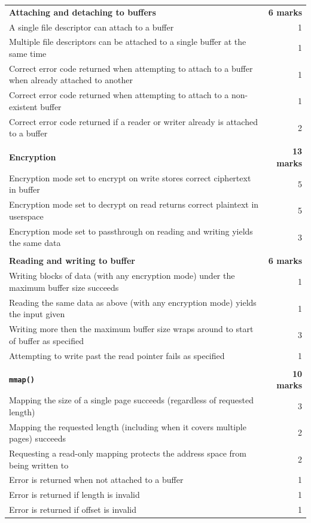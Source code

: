 \documentclass[12pt,a4paper]{article}
\begin{document}
\begin{longtable}{p{13cm} r}
    & \\
    \midrule
    \textbf{Attaching and detaching to buffers} & \textbf{6 marks} \\
    A single file descriptor can attach to a buffer & 1 \\
    Multiple file descriptors can be attached to a single buffer at the same time & 1 \\
    Correct error code returned when attempting to attach to a buffer when already attached to another & 1 \\
    Correct error code returned when attempting to attach to a non-existent buffer & 1 \\
    Correct error code returned if a reader or writer already is attached to a buffer & 2 \\

    & \\
    \midrule
    \textbf{Encryption} & \textbf{13 marks} \\
    Encryption mode set to encrypt on write stores correct ciphertext in buffer & 5 \\
    Encryption mode set to decrypt on read returns correct plaintext in userspace & 5 \\
    Encryption mode set to passthrough on reading and writing yields the same data & 3 \\

    & \\
    \midrule
    \textbf{Reading and writing to buffer} & \textbf{6 marks} \\
    Writing blocks of data (with any encryption mode) under the maximum buffer size succeeds & 1 \\
    Reading the same data as above (with any encryption mode) yields the input given & 1 \\
    Writing more then the maximum buffer size wraps around to start of buffer as specified & 3 \\
    Attempting to write past the read pointer fails as specified & 1 \\

    & \\
    \midrule
    \textbf{\texttt{mmap()}} & \textbf{10 marks} \\
    Mapping the size of a single page succeeds (regardless of requested length) & 3 \\
    Mapping the requested length (including when it covers multiple pages) succeeds & 2 \\
    Requesting a read-only mapping protects the address space from being written to & 2 \\
    Error is returned when not attached to a buffer & 1 \\
    Error is returned if length is invalid & 1 \\
    Error is returned if offset is invalid & 1 \\


\end{longtable}
\end{document}
